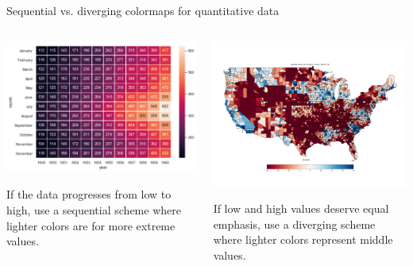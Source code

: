 \documentclass[aspectratio=169]{../latex_main/tntbeamer}  %
\begin{document}
	
	
	\begin{frame}{Sequential vs. diverging colormaps for quantitative data}
	    \begin{columns}
	        \begin{column}{.5\textwidth}

	                    \centering
	                    \includegraphics[scale=.5]{Bild66}

	                If the data progresses from low to high, use a sequential scheme where lighter colors are for more extreme values.
	        \end{column}
	        
	        
	        \begin{column}{.5\textwidth}
	        
	                    \vspace{-2em}
	                    \centering
	                    \includegraphics[scale=.5]{Bild67}

	                If low and high values deserve equal emphasis, use a diverging scheme where lighter colors represent middle values.
	        \end{column}
	    \end{columns}
	\end{frame}
	
\end{document}
